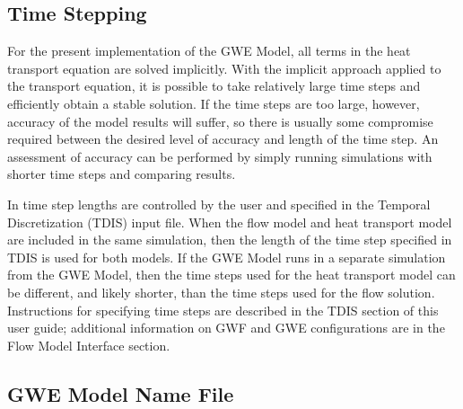 \subsection{Time Stepping}

For the present implementation of the GWE Model, all terms in the heat transport equation are solved implicitly.  With the implicit approach applied to the transport equation, it is possible to take relatively large time steps and efficiently obtain a stable solution.  If the time steps are too large, however, accuracy of the model results will suffer, so there is usually some compromise required between the desired level of accuracy and length of the time step.  An assessment of accuracy can be performed by simply running simulations with shorter time steps and comparing results.

In \mf time step lengths are controlled by the user and specified in the Temporal Discretization (TDIS) input file.  When the flow model and heat transport model are included in the same simulation, then the length of the time step specified in TDIS is used for both models.  If the GWE Model runs in a separate simulation from the GWE Model, then the time steps used for the heat transport model can be different, and likely shorter, than the time steps used for the flow solution.  Instructions for specifying time steps are described in the TDIS section of this user guide; additional information on GWF and GWE configurations are in the Flow Model Interface section.  



\newpage
\subsection{GWE Model Name File}


%

%

%


